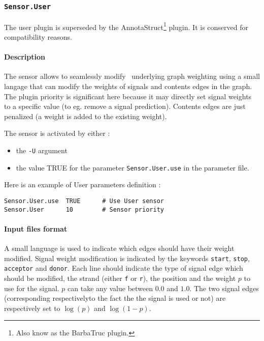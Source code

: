 
\subsubsection{\texttt{Sensor.User}}
\label{pluguser}

The user plugin is superseded by the AnnotaStruct\footnote{Also know
  as the BarbaTruc plugin.} plugin. It is conserved for compatibility
reasons.

\paragraph{Description}

The sensor allows to seamlessly modify \EuGene\ underlying graph
weighting using a small langage that can modify the weights of signals
and contents edges in the graph. The plugin priority is significant
here because it may directly set signal weights to a specific value
(to eg. remove a signal prediction). Contents edges are just penalized
(a weight is added to the existing weight).

The sensor is activated by either :
\begin{itemize}
\item the \texttt{-U} argument 
\item the value TRUE for the parameter \texttt{Sensor.User.use} in the
  parameter file.
\end{itemize}
Here is an example of User parameters definition :
\begin{Verbatim}[fontsize=\small]
Sensor.User.use  TRUE      # Use User sensor
Sensor.User      10        # Sensor priority
\end{Verbatim}

\paragraph{Input files format}

A small language is used to indicate which edges should have their
weight modified. Signal weight modification is indicated by the
keywords \texttt{start}, \texttt{stop}, \texttt{acceptor} and
\texttt{donor}. Each line should indicate the type of signal edge
which should be modified, the strand (either \texttt{f} or
\texttt{r}), the position and the weight $p$ to use for the signal.
$p$ can take any value between $0.0$ and $1.0$. The two signal edges
(corresponding respectivelyto the fact the the signal is used or not)
are respectively set to $\log(p)$ and $\log(1-p)$.

